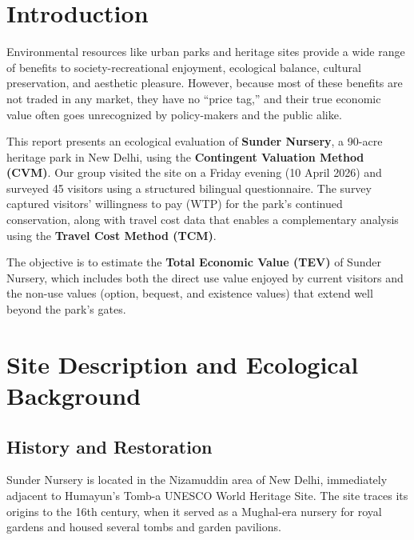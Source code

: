 \documentclass[12pt, a4paper]{article}
\begin{document}
\tableofcontents
\newpage

\section{Introduction}

Environmental resources like urban parks and heritage sites provide a wide range of benefits to society-recreational enjoyment, ecological balance, cultural preservation, and aesthetic pleasure. However, because most of these benefits are not traded in any market, they have no ``price tag,'' and their true economic value often goes unrecognized by policy-makers and the public alike.

This report presents an ecological evaluation of \textbf{Sunder Nursery}, a 90-acre heritage park in New Delhi, using the \textbf{Contingent Valuation Method (CVM)}. Our group visited the site on a Friday evening (10 April 2026) and surveyed 45 visitors using a structured bilingual questionnaire. The survey captured visitors' willingness to pay (WTP) for the park's continued conservation, along with travel cost data that enables a complementary analysis using the \textbf{Travel Cost Method (TCM)}.

The objective is to estimate the \textbf{Total Economic Value (TEV)} of Sunder Nursery, which includes both the direct use value enjoyed by current visitors and the non-use values (option, bequest, and existence values) that extend well beyond the park's gates.

\section{Site Description and Ecological Background}

\subsection{History and Restoration}

Sunder Nursery is located in the Nizamuddin area of New Delhi, immediately adjacent to Humayun's Tomb-a UNESCO World Heritage Site. The site traces its origins to the 16th century, when it served as a Mughal-era nursery for royal gardens and housed several tombs and garden pavilions.
\end{document}
